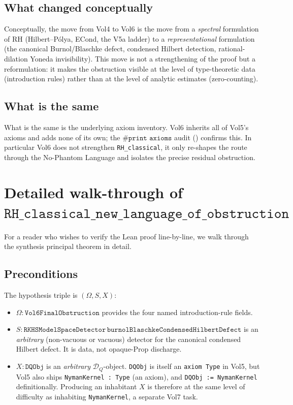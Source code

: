 \documentclass[11pt]{article}
\theoremstyle{plain}
\theoremstyle{definition}
\theoremstyle{remark}
\newcommand{\DQ}{\mathcal{D}_{Q}}
\newcommand{\code}[1]{\texttt{#1}}
\newcommand{\Obs}{\Omega}
\begin{document}
\subsection{What changed conceptually}

Conceptually, the move from Vol4 to Vol6 is the move from a
\emph{spectral} formulation of RH (Hilbert--Pólya, ECond, the V5a
ladder) to a \emph{representational} formulation (the canonical
Burnol/Blaschke defect, condensed Hilbert detection, rational-dilation
Yoneda invisibility).  This move is not a strengthening of the proof
but a reformulation: it makes the obstruction visible at the level of
type-theoretic data (introduction rules) rather than at the level of
analytic estimates (zero-counting).

\subsection{What is the same}

What is the same is the underlying axiom inventory.  Vol6 inherits
all of Vol5's axioms and adds none of its own; the
\(\code{\#print axioms}\) audit
() confirms this.  In particular Vol6 does
not strengthen \code{RH\_classical}, it only re-shapes the route
through the No-Phantom Language and isolates the precise residual
obstruction.

\section{Detailed walk-through of \(\code{RH\_classical\_new\_language\_of\_obstruction}\)}
\label{sec:walkthrough}

For a reader who wishes to verify the Lean proof line-by-line, we
walk through the synthesis principal theorem in detail.

\subsection{Preconditions}

The hypothesis triple is \((\Obs, S, X)\):
\begin{itemize}[leftmargin=2em]
  \item \(\Obs : \code{Vol6FinalObstruction}\) provides the
        four named introduction-rule fields.
  \item \(S : \code{RKHSModelSpaceDetector}\,
            \code{burnolBlaschkeCondensedHilbertDefect}\)
        is an \emph{arbitrary} (non-vacuous or vacuous) detector for
        the canonical condensed Hilbert defect.  It is data, not
        opaque-Prop discharge.
  \item \(X : \code{DQObj}\) is an \emph{arbitrary} \(\DQ\)-object.
        \code{DQObj} is itself an \code{axiom Type}
        in Vol5, but Vol5 also ships
        \code{NymanKernel : Type} (an axiom),
        and \code{DQObj := NymanKernel} definitionally.
        Producing an inhabitant \(X\) is therefore at the same
        level of difficulty as inhabiting \code{NymanKernel},
        a separate Vol7 task.
\end{itemize}
\end{document}
